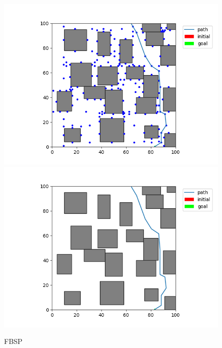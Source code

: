 \documentclass[12pt,a4paper]{article}
\begin{document}
\begin{figure}[H]
\centering
	\includegraphics[scale=.40]{20_20_fbsp_state}
    \includegraphics[scale=.40]{20_20_fbsp_path}
\caption{FBSP}
\end{figure}

\newpage
\end{document}
